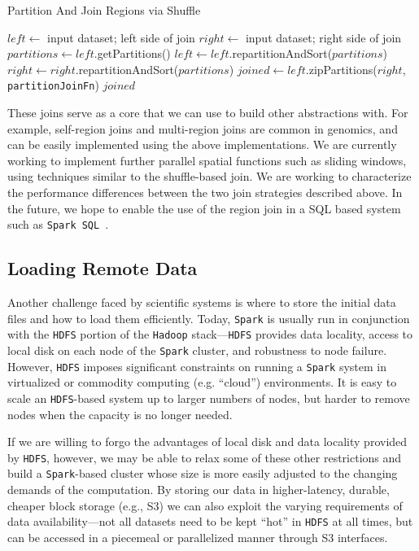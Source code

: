 \documentclass{sig-alternate}
\begin{document}
\begin{algorithm}
\caption{Partition And Join Regions via Shuffle}
\label{alg:shuffle-region-join}
\begin{algorithmic}
\STATE $left \leftarrow$ input dataset; left side of join
\STATE $right \leftarrow$ input dataset; right side of join
\STATE $partitions \leftarrow left$.getPartitions()
\STATE $left \leftarrow left$.repartitionAndSort($partitions$)
\STATE $right \leftarrow right$.repartitionAndSort($partitions$)
\STATE $joined \leftarrow left$.zipPartitions($right$, \texttt{partitionJoinFn})
\RETURN $joined$
\end{algorithmic}
\end{algorithm}

These joins serve as a core that we can use to build other abstractions with. For example, self-region joins and
multi-region joins are common in genomics, and can be easily implemented using the above implementations.
We are currently working to implement further parallel spatial functions such as sliding windows, using techniques
similar to the shuffle-based join. We are working to characterize the performance differences between the two
join strategies described above. In the future, we hope to enable the use of the region join in a SQL based system
such as \texttt{Spark SQL}~\cite{armbrust15}.

\subsection{Loading Remote Data}
\label{sec:loading-remote-data}

Another challenge faced by scientific systems is where to store the initial data files and how to load them
efficiently. Today, \texttt{Spark} is usually run in conjunction with the \texttt{HDFS} portion of the \texttt{Hadoop}
stack---\texttt{HDFS} provides data locality, access to local disk on each node of the \texttt{Spark} cluster, and
robustness to node failure. However, \texttt{HDFS} imposes significant constraints on running a \texttt{Spark} system
in virtualized or
commodity computing (e.g. ``cloud'') environments.  It is easy to scale an \texttt{HDFS}-based system up to
larger numbers of nodes, but harder to remove nodes when the capacity is no longer needed.  

If we are willing to forgo the advantages of local disk and data locality provided by \texttt{HDFS}, however, we
may be able to relax some of these other restrictions and build a \texttt{Spark}-based cluster whose size is more
easily adjusted to the changing demands of the computation. By storing our data in higher-latency,
durable, cheaper block storage (e.g., S3) we can also exploit the varying requirements of data \linebreak
availability---not all datasets need to be kept ``hot'' in \texttt{HDFS} at all times, but can be accessed in a
piecemeal or parallelized manner through S3 interfaces.
\end{document}
